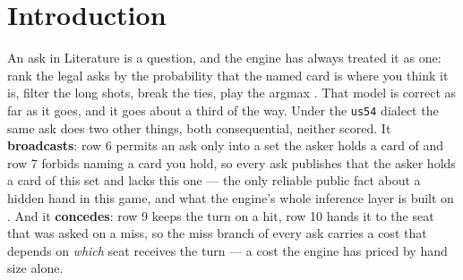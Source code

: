 \documentclass[11pt]{article}
\newcommand{\code}[1]{\texttt{#1}}
\newcommand{\usff}{\code{us54}}
\begin{document}
\begin{abstract}
measured below the instrument's floor and was \emph{reverted rather than shipped}, because a
listed-but-inert knob contaminates a measured vector. Concealment is a counter-weapon worth $+0.97
\pm 0.27$ added to defusal against defusing opponents, and \emph{worse than plain when played
alone}. This project's own intransitive-triangle claim is refuted at $4{,}000$ pairs per edge on two
independent bank sets --- the $2\times2$ is a strict total order $DC > D > P > C$ --- and replaced
by an opponent-dependent argmax worth one bit and up to $+0.29 \pm 0.14$. Two engine defects are
reported: \code{missTarget: 'fewest'} has the wrong sign (hand size correlates $-0.147$ with the
cards a conceded seat takes, against the licence estimator's $+0.421$), and \code{style.signalling}
is unreachable under \usff{}. Two facts are stated rather than buried: the certain-hit gate exists
because an adversarial pre-commit review found the defusal credit could displace a certain hit ($9$
occurrences over $150$ games $\times$ $9$ styles against $0$ for the control), and the project's own
detection-floor characterisation reclassifies two of this paper's nulls as non-measurements rather
than zeros.
\end{abstract}

\section{Introduction}
\label{sec:intro}

An ask in Literature is a question, and the engine has always treated it as one: rank the legal asks
by the probability that the named card is where you think it is, filter the long shots, break the
ties, play the argmax \cite{v05paper}. That model is correct as far as it goes, and it goes about a
third of the way. Under the \usff{} dialect \cite{rules} the same ask does two other things, both
consequential, neither scored. It \textbf{broadcasts}: row 6 permits an ask only into a set the
asker holds a card of and row 7 forbids naming a card you hold, so every ask publishes that the
asker holds a card of this set and lacks this one --- the only reliable public fact about a hidden
hand in this game, and what the engine's whole inference layer is built on \cite{obspaper,repo}. And
it \textbf{concedes}: row 9 keeps the turn on a hit, row 10 hands it to the seat that was asked on a
miss, so the miss branch of every ask carries a cost that depends on \emph{which} seat receives the
turn --- a cost the engine has priced by hand size alone.
\end{document}
